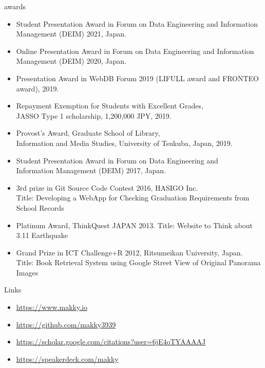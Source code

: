\documentclass{resume} %
\begin{document}
\begin{rSection}{awards}
\begin{itemize}
  \item Student Presentation Award in Forum on Data Engineering and Information \\ Management (DEIM) 2021, Japan.
  \item Online Presentation Award in Forum on Data Engineering and Information \\ Management (DEIM) 2020, Japan.
  \item Presentation Award in WebDB Forum 2019 (LIFULL award and FRONTEO award), 2019.
  \item Repayment Exemption for Students with Excellent Grades, \\JASSO Type 1 scholarship, 1,200,000 JPY, 2019.
  \item Provost’s Award, Graduate School of Library, \\Information and Media Studies, University of Tsukuba, Japan, 2019.
  \item Student Presentation Award in Forum on Data Engineering and \\Information Management (DEIM) 2017, Japan.
  \item 3rd prize in Git Source Code Contest 2016, HASIGO Inc. \\Title: Developing a WebApp for Checking Graduation Requirements from School Records
  \item Platinum Award, ThinkQuest JAPAN 2013. Title: Website to Think about 3.11 Earthquake
  \item Grand Prize in ICT Challenge+R 2012, Ritsumeikan University, Japan. \\Title: Book Retrieval System using Google Street View of Original Panorama Images
\end{itemize}

\end{rSection}


\begin{rSection}{Links}
\begin{itemize}
  \item \url{https://www.makky.io}
  \item \url{https://github.com/makky3939}
  \item \url{https://scholar.google.com/citations?user=6jE4oTYAAAAJ}
  \item \url{https://speakerdeck.com/makky}
\end{itemize}
\end{rSection}
\end{document}
